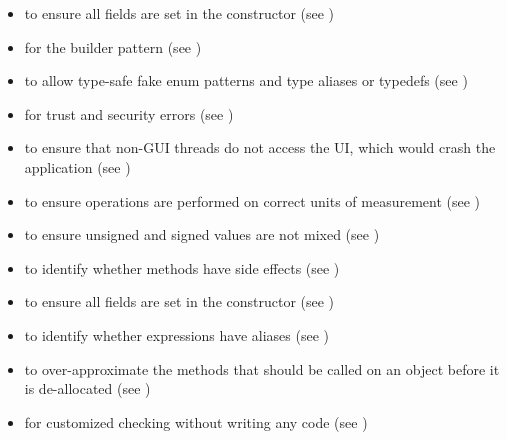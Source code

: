 \begin{itemize}
\item
   to ensure all
  fields are set in the constructor (see
  )
\item
   for
  the builder pattern (see )
\item
   to allow type-safe fake enum
  patterns and type aliases or typedefs (see )
\item
   for trust and security errors
  (see )
\item
   to ensure that non-GUI
  threads do not access the UI, which would crash the application
  (see )
\item
   to ensure operations are
  performed on correct units of measurement
  (see )
\item
   to
  ensure unsigned and signed values are not mixed
  (see )
\item
   to identify whether
  methods have side effects (see )
\item
   to ensure all
  fields are set in the constructor (see
  )
\item
   to identify whether
  expressions have aliases (see )
\item
   to over-approximate the
  methods that should be called on an object before it is de-allocated (see )
\item
   for customized checking without
  writing any code (see )
\end{itemize}




